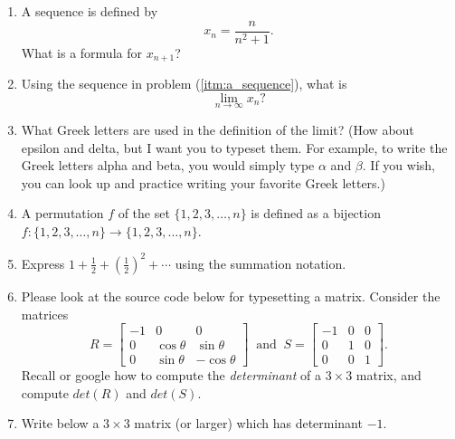 \documentclass[12pt]{amsart}
\begin{document}
\begin{enumerate}
\item \label{itm:a_sequence} A sequence is defined by
\[ x_n = \frac{n}{n^2+1}. \]
What is a formula for $x_{n+1}$?

\item Using the sequence in problem (\ref{itm:a_sequence}), what is 
  \[ \lim_{n \to \infty} x_n? \]

\item What Greek letters are used in the definition of the limit?
(How about epsilon and delta, but I want you to typeset them. For example, to write the Greek letters alpha and beta, you would simply type $\alpha$ and $\beta$. If you wish, you can look up and practice writing your favorite Greek letters.) 


\item A permutation $f$ of the set $\{1,2,3,\dots,n\}$ is defined as a bijection $f: \{1,2,3,\dots,n\} \to \{1,2,3,\dots,n\}$.


\item Express $1+\frac{1}{2}+\left(\frac{1}{2}\right)^2 + \cdots$ using
  the summation notation. 

\item Please look at the source code below for typesetting a matrix. Consider the matrices  
\[
R =
  \begin{bmatrix}
    -1 & 0 & 0 \\
    0 & \cos{\theta} & \sin{\theta} \\
    0 & \sin{\theta} & -\cos{\theta}
  \end{bmatrix}
~\text{ and }~
S = 
  \begin{bmatrix}
    -1 & 0 & 0 \\
    0 & 1 & 0 \\
    0 & 0 & 1
  \end{bmatrix}.
\]
Recall or google how to compute the \emph{determinant} of a $3 \times 3$ matrix, and compute $det(R)$ and $det(S)$.

\item Write below a $3 \times 3$ matrix (or larger) which has determinant $-1$.


\end{enumerate}
\end{document}

